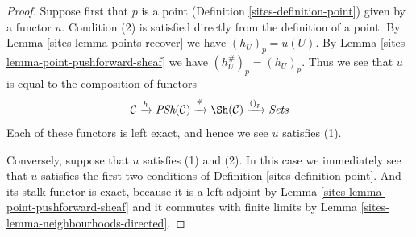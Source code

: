 \begin{proof}

Suppose first that $p$ is a point (Definition \ref{sites-definition-point})
given by a functor $u$. Condition (2) is satisfied directly from
the definition of a point. By Lemma \ref{sites-lemma-points-recover}
we have $(h_U)_p = u(U)$. By Lemma \ref{sites-lemma-point-pushforward-sheaf}
we have $(h_U^\#)_p = (h_U)_p$. Thus we see that $u$
is equal to the composition of functors
$$
\mathcal{C} \xrightarrow{h}
\textit{PSh}(\mathcal{C}) \xrightarrow{{}^\#}
\Sh(\mathcal{C}) \xrightarrow{()_p}
\textit{Sets}
$$
Each of these functors is left exact, and hence we see $u$ satisfies (1).

\medskip\noindent
Conversely, suppose that $u$ satisfies (1) and (2).
In this case we immediately see that $u$ satisfies the first two
conditions of Definition \ref{sites-definition-point}. And its
stalk functor is exact, because it is a left adjoint by
Lemma \ref{sites-lemma-point-pushforward-sheaf} and it commutes
with finite limits by Lemma \ref{sites-lemma-neighbourhoods-directed}.
\end{proof}

